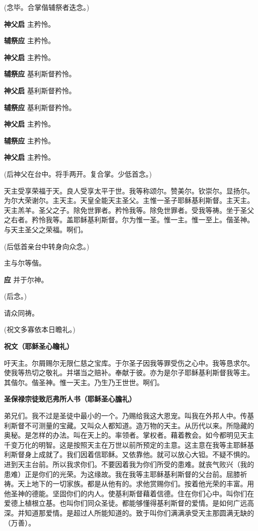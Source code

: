 \documentclass[UTF8,17pt]{ctexart}
\begin{document}
(念毕。合掌偕辅祭者迭念。)

\textbf{神父启} \quad 主矜怜。

\textbf{辅祭应} \quad 主矜怜。

\textbf{神父启} \quad 主矜怜。

\textbf{辅祭应} \quad 基利斯督矜怜。

\textbf{神父启} \quad 基利斯督矜怜。

\textbf{辅祭应} \quad 基利斯督矜怜。

\textbf{神父启} \quad 主矜怜。

\textbf{辅祭应} \quad 主矜怜。

\textbf{神父启} \quad 主矜怜。

(后神⽗在台中。将⼿两开。复合掌。少低⾸念。)

天主受享荣福于天。良⼈受享太平于世。我等称颂尔。赞美尔。钦崇尔。显扬尔。为尔⼤荣谢尔。主天主。天皇全能天主圣⽗。主惟⼀圣⼦耶稣基利斯督。主天主。天主羔⽺。圣⽗之⼦。除免世罪者。矜怜我等。除免世罪者。受我等祷。坐于圣⽗之右者。矜怜我等。盖耶稣基利斯督。尔为惟⼀圣。惟⼀主。惟⼀⾄上。偕圣神。与天主圣⽗之荣福。啊们。

(后低⾸亲台中转⾝向众念。)

主与尔等偕。

\textbf{应} \quad 并于尔神。

(后念。)

请众同祷。

(祝⽂多寡依本⽇瞻礼。)

\textbf{祝文（耶稣圣心瞻礼）}

吁天主。尔屑赐尔⽆限仁慈之宝库。于尔圣⼦因我等罪受伤之⼼中。我等恳求尔。使我等热切之敬礼。并堪当之赔补。奉献于彼。亦为是尔⼦耶稣基利斯督我等主。其偕尔。偕圣神。惟⼀天主。乃⽣乃王世世。啊们。

\textbf{圣保禄宗徒致厄弗所⼈书（耶稣圣⼼膽礼）}

弟兄们。我不过是圣徒中最⼩的⼀个。乃赐给我这⼤恩宠。叫我在外邦⼈中。传基利斯督不可测量的宝藏。又叫众⼈都知道。造万物的天主。从历代以来。所隐藏的奥秘。是怎样的办法。叫在天上的。率领者。掌权者。藉着教会。如今都明见天主千变万化的明智。这是按照天主在万世以前所预定的主意。这主意在我等主耶稣基利斯督身上成就了。我们因着信耶稣。又依靠他。就可以放心大钽。不疑不惧的。进到天主台前。所以我求你们。不要因着我为你们所受的患难。就丧气败兴（我的患难）正是你们的光荣。为这缘故。我在我等主耶稣基利斯督的父台前。屈膝祈祷。天上地下的一切家族。都是从他有的。求他赏赐你们。按着他光荣的丰富。用他圣神的德能。坚固你们的内人。使基利斯督藉着信德。住在你们心中。叫你们在爱德上植根立基。也叫你们同众圣徒。都能够懂得基利斯督的爱情。是如何广远高深。并知道那爱情。是超过人所能知道的。致于叫你们满满承受天主那圆满无缺的（万善）。
\end{document}
